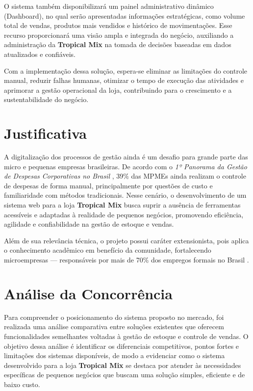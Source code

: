 O sistema também disponibilizará um painel administrativo dinâmico (Dashboard), no qual serão apresentadas informações estratégicas, como volume total de vendas, produtos mais vendidos e histórico de movimentações. Esse recurso proporcionará uma visão ampla e integrada do negócio, auxiliando a administração da \textbf{Tropical Mix} na tomada de decisões baseadas em dados atualizados e confiáveis.

Com a implementação dessa solução, espera-se eliminar as limitações do controle manual, reduzir falhas humanas, otimizar o tempo de execução das atividades e aprimorar a gestão operacional da loja, contribuindo para o crescimento e a sustentabilidade do negócio.



\section{Justificativa}


A digitalização dos processos de gestão ainda é um desafio para grande parte das micro e pequenas empresas brasileiras. De acordo com o \textit{1º Panorama da Gestão de Despesas Corporativas no Brasil} \cite{contasimples2025}, 39\% das MPMEs ainda realizam o controle de despesas de forma manual, principalmente por questões de custo e familiaridade com métodos tradicionais. Nesse cenário, o desenvolvimento de um sistema web para a loja \textbf{Tropical Mix} busca suprir a ausência de ferramentas acessíveis e adaptadas à realidade de pequenos negócios, promovendo eficiência, agilidade e confiabilidade na gestão de estoque e vendas.

Além de sua relevância técnica, o projeto possui caráter extensionista, pois aplica o conhecimento acadêmico em benefício da comunidade, fortalecendo microempresas — responsáveis por mais de 70\% dos empregos formais no Brasil \cite{sebrae2024}. 


\section{Análise da Concorrência}
Para compreender o posicionamento do sistema proposto no mercado, foi realizada uma análise comparativa entre soluções existentes que oferecem funcionalidades semelhantes voltadas à gestão de estoque e controle de vendas. O objetivo dessa análise é identificar os diferenciais competitivos, pontos fortes e limitações dos sistemas disponíveis, de modo a evidenciar como o sistema desenvolvido para a loja \textbf{Tropical Mix} se destaca por atender às necessidades específicas de pequenos negócios que buscam uma solução simples, eficiente e de baixo custo. 

